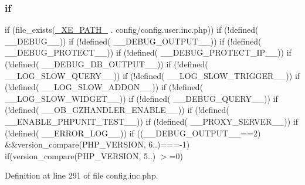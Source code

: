 \subsubsection{\texorpdfstring{if}{if}}
{\footnotesize\ttfamily if (file\+\_\+exists(\hyperlink{config_8inc_8php_a5387c7a3f2aa38adf16f324cee88db88}{\+\_\+\+X\+E\+\_\+\+P\+A\+T\+H\+\_\+} . \textquotesingle{}config/config.\+user.\+inc.\+php\textquotesingle{})) if (!defined( \textquotesingle{}\+\_\+\+\_\+\+D\+E\+B\+U\+G\+\_\+\+\_\+\textquotesingle{})) if (!defined( \textquotesingle{}\+\_\+\+\_\+\+D\+E\+B\+U\+G\+\_\+\+O\+U\+T\+P\+U\+T\+\_\+\+\_\+\textquotesingle{})) if (!defined( \textquotesingle{}\+\_\+\+\_\+\+D\+E\+B\+U\+G\+\_\+\+P\+R\+O\+T\+E\+C\+T\+\_\+\+\_\+\textquotesingle{})) if (!defined( \textquotesingle{}\+\_\+\+\_\+\+D\+E\+B\+U\+G\+\_\+\+P\+R\+O\+T\+E\+C\+T\+\_\+\+I\+P\+\_\+\+\_\+\textquotesingle{})) if (!defined( \textquotesingle{}\+\_\+\+\_\+\+D\+E\+B\+U\+G\+\_\+\+D\+B\+\_\+\+O\+U\+T\+P\+U\+T\+\_\+\+\_\+\textquotesingle{})) if (!defined( \textquotesingle{}\+\_\+\+\_\+\+L\+O\+G\+\_\+\+S\+L\+O\+W\+\_\+\+Q\+U\+E\+R\+Y\+\_\+\+\_\+\textquotesingle{})) if (!defined( \textquotesingle{}\+\_\+\+\_\+\+L\+O\+G\+\_\+\+S\+L\+O\+W\+\_\+\+T\+R\+I\+G\+G\+E\+R\+\_\+\+\_\+\textquotesingle{})) if (!defined( \textquotesingle{}\+\_\+\+\_\+\+L\+O\+G\+\_\+\+S\+L\+O\+W\+\_\+\+A\+D\+D\+O\+N\+\_\+\+\_\+\textquotesingle{})) if (!defined( \textquotesingle{}\+\_\+\+\_\+\+L\+O\+G\+\_\+\+S\+L\+O\+W\+\_\+\+W\+I\+D\+G\+E\+T\+\_\+\+\_\+\textquotesingle{})) if (!defined( \textquotesingle{}\+\_\+\+\_\+\+D\+E\+B\+U\+G\+\_\+\+Q\+U\+E\+R\+Y\+\_\+\+\_\+\textquotesingle{})) if (!defined( \textquotesingle{}\+\_\+\+\_\+\+O\+B\+\_\+\+G\+Z\+H\+A\+N\+D\+L\+E\+R\+\_\+\+E\+N\+A\+B\+L\+E\+\_\+\+\_\+\textquotesingle{})) if (!defined( \textquotesingle{}\+\_\+\+\_\+\+E\+N\+A\+B\+L\+E\+\_\+\+P\+H\+P\+U\+N\+I\+T\+\_\+\+T\+E\+S\+T\+\_\+\+\_\+\textquotesingle{})) if (!defined( \textquotesingle{}\+\_\+\+\_\+\+P\+R\+O\+X\+Y\+\_\+\+S\+E\+R\+V\+E\+R\+\_\+\+\_\+\textquotesingle{})) if (!defined( \textquotesingle{}\+\_\+\+\_\+\+E\+R\+R\+O\+R\+\_\+\+L\+O\+G\+\_\+\+\_\+\textquotesingle{})) if ((\+\_\+\+\_\+\+D\+E\+B\+U\+G\+\_\+\+O\+U\+T\+P\+U\+T\+\_\+\+\_\+==2) \&\&version\+\_\+compare(P\+H\+P\+\_\+\+V\+E\+R\+S\+I\+ON, \textquotesingle{}6..\textquotesingle{})===-\/1) if(version\+\_\+compare(P\+H\+P\+\_\+\+V\+E\+R\+S\+I\+ON, \textquotesingle{}5..\textquotesingle{}) $>$=0)}



Definition at line 291 of file config.\+inc.\+php.

